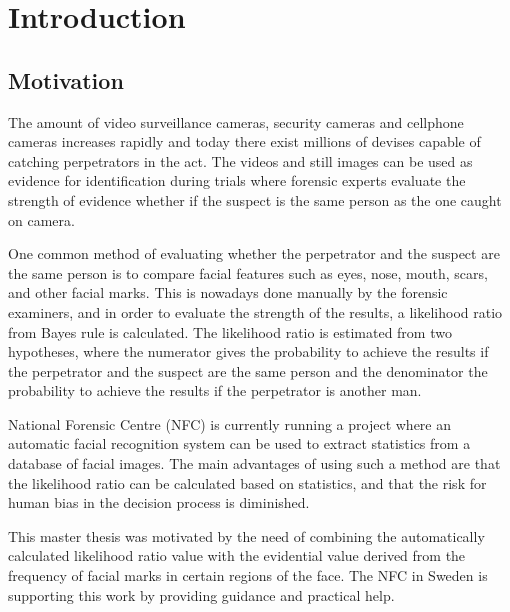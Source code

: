 \chapter{Introduction}\label{cha:intro}
\section{Motivation}

The amount of video surveillance cameras, security cameras and cellphone cameras increases rapidly and today there exist millions of devises capable of catching perpetrators in the act. The videos and still images can be
used as evidence for identification during trials where forensic experts evaluate the strength of evidence whether if the suspect is the same person as the one caught
on camera.


One common method of evaluating whether the perpetrator and the suspect are the same person is to compare facial features such as eyes, nose, mouth, scars, and other facial marks. This is nowadays done manually \cite{face_soft} by the forensic examiners, and in order to evaluate the strength of the results, a likelihood ratio \cite{NFC_stat} from Bayes rule is calculated. The likelihood ratio is estimated from two hypotheses, where the numerator gives the probability to achieve the results 
if the perpetrator and the suspect are the same person and the denominator the probability to achieve the results if the perpetrator is another man. 

National Forensic Centre (NFC) is currently running a project where an automatic facial recognition system can be used to extract statistics from a database of facial images. The main advantages of using such a method are that the likelihood ratio can be calculated based on statistics, and that the risk for human bias in the decision process is diminished.

This master thesis was motivated by the need of combining the automatically calculated likelihood ratio value with the evidential value derived from the frequency of facial marks in certain regions of the face. The NFC in Sweden is supporting this work by providing guidance and practical help.

